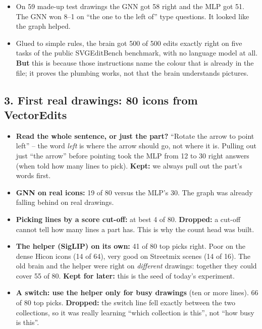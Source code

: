 \documentclass[11pt,a4paper]{article}
\begin{document}
\begin{itemize}[leftmargin=1.6em]
  \item On 59 made-up test drawings the GNN got 58 right and the MLP got 51. The GNN won 8--1 on ``the one to the left of'' type questions. It looked like the graph helped.
  \item Glued to simple rules, the brain got 500 of 500 edits exactly right on five tasks of the public SVGEditBench benchmark, with no language model at all. \textbf{But} this is because those instructions name the colour that is already in the file; it proves the plumbing works, not that the brain understands pictures.
\end{itemize}

\subsection*{3. First real drawings: 80 icons from VectorEdits}

\begin{itemize}[leftmargin=1.6em]
  \item \textbf{Read the whole sentence, or just the part?} ``Rotate the arrow to point left'' -- the word \emph{left} is where the arrow should go, not where it is. Pulling out just ``the arrow'' before pointing took the MLP from 12 to 30 right answers (when told how many lines to pick). \textbf{Kept:} we always pull out the part's words first.
  \item \textbf{GNN on real icons:} 19 of 80 versus the MLP's 30. The graph was already falling behind on real drawings.
  \item \textbf{Picking lines by a score cut-off:} at best 4 of 80. \textbf{Dropped:} a cut-off cannot tell how many lines a part has. This is why the count head was built.
  \item \textbf{The helper (SigLIP) on its own:} 41 of 80 top picks right. Poor on the dense Hicon icons (14 of 64), very good on Streetmix scenes (14 of 16). The old brain and the helper were right on \emph{different} drawings: together they could cover 55 of 80. \textbf{Kept for later:} this is the seed of today's experiment.
  \item \textbf{A switch: use the helper only for busy drawings} (ten or more lines). 66 of 80 top picks. \textbf{Dropped:} the switch line fell exactly between the two collections, so it was really learning ``which collection is this'', not ``how busy is this''.
\end{itemize}
\end{document}

